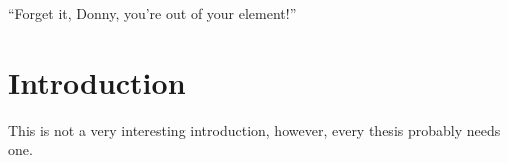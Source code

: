 \begin{savequote}[10cm] %
\sffamily
``Forget it, Donny, you're out of your element!'' 
\end{savequote}

\chapter{Introduction}

This is not a very interesting introduction, however, every thesis probably
needs one.

